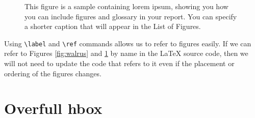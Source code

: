 \begin{figure}
  \centering



  \caption[Sample figure]{This figure is a sample containing \gls{lorem ipsum},
  showing you how you can include figures and glossary in your report.
  You can specify a shorter caption that will appear in the List of Figures.}
  \label{fig:sample-figure}
\end{figure}

Using \verb.\label. and \verb.\ref. commands allows us to refer to
figures easily. If we can refer to Figures
\ref{fig:walrus} and \ref{fig:sample-figure} by name in the {\LaTeX}
source code, then we will not need to update the code that refers to it
even if the placement or ordering of the figures changes.

\loremipsum\loremipsum


\loremipsum\loremipsum\loremipsum

\section{Overfull hbox}

